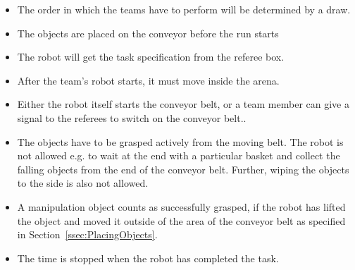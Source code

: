 \begin{itemize}
\item The order in which the teams have to perform will be determined by a draw.
\item The objects are placed on the conveyor before the run starts
\item The robot will get the task specification from the referee box.
\item After the team's robot starts, it must move inside the arena.
\item Either the robot itself starts the conveyor belt, or a team member can give a signal to the referees to switch on the conveyor belt..
\item The objects have to be grasped actively from the moving belt. The robot is not allowed e.g. to wait at the end with a particular basket and collect the falling objects from the end of the conveyor belt. Further, wiping the objects to the side is also not allowed.
\item A manipulation object counts as successfully grasped, if the robot has lifted the object and moved it outside of the area of the conveyor belt as specified in Section~\ref{ssec:PlacingObjects}.
\item The time is stopped when the robot has completed the task.
\end{itemize}



%
%
